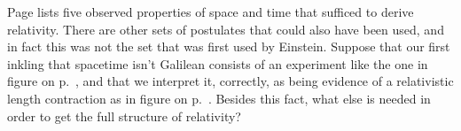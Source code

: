Page \pageref{spacetime-properties} lists five observed properties of
space and time that sufficed to derive relativity. There are other
sets of postulates that could also have been used, and in fact this
was not the set that was first used by Einstein. Suppose that our
first inkling that spacetime isn't Galilean consists of an experiment
like the one in figure  on p.~\pageref{fig:magdeflects},
and that we interpret it, correctly, as being evidence of a relativistic
length contraction as in figure  on
p.~\pageref{fig:magrelativity}. Besides this
fact, what else is needed in order to get the full structure of
relativity?
